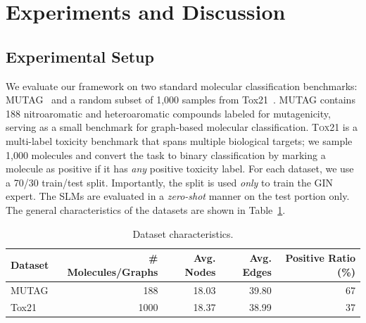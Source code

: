 \documentclass[
]{ceurart}
\newcommand{\dataset}[1]{\textsc{#1}}
\newcommand{\gin}{\textsc{GIN}}
\newcommand{\gnne}{\textsc{GNNExplainer}}
\begin{document}

\section{Experiments and Discussion}
\label{sec:exp}

\subsection{Experimental Setup}

We evaluate our framework on two standard molecular classification benchmarks: MUTAG~\cite{mutag} and a random subset of 1,000 samples from Tox21~\cite{tox21}. 
\dataset{MUTAG} contains 188 nitroaromatic and heteroaromatic compounds labeled for mutagenicity, serving as a small benchmark for graph-based molecular classification. 
\dataset{Tox21} is a multi-label toxicity benchmark that spans multiple biological targets; we sample 1,000 molecules and convert the task to binary classification by marking a molecule as positive if it has \emph{any} positive toxicity label. For each dataset, we use a 70/30 train/test split. Importantly, the split is used \emph{only} to train the \gin{} expert.
The SLMs are evaluated in a \emph{zero-shot} manner on the test portion only. The general characteristics of the datasets are shown in Table~\ref{tab:dataset_characteristics}.


\begin{table}[htbp]
\centering
\caption{Dataset characteristics.}
\label{tab:dataset_characteristics}
\begin{tabular}{lrrrr}
\toprule
\textbf{Dataset} & \textbf{\# Molecules/Graphs} & \textbf{Avg. Nodes} & \textbf{Avg. Edges} & \textbf{Positive Ratio (\%)} \\
\midrule
MUTAG        & 188  & 18.03 & 39.80 & 67 \\
Tox21 & 1000 & 18.37 & 38.99 & 37 \\
\bottomrule
\end{tabular}
\end{table}
\end{document}
